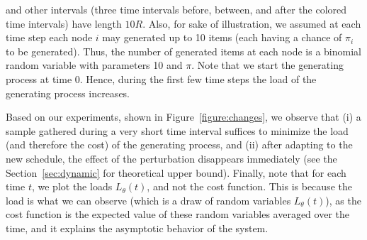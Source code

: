 

and other intervals (three time intervals before, between, and after the colored time intervals) have length $10R$. Also, for sake of illustration, we assumed at each time step each node $i$ may generated up to 10 items (each having a chance of $\pi_i$ to be generated). Thus, the number of generated items at each node is a binomial random variable with parameters 10 and $\pi$.
Note that we start the generating process at time 0. Hence, during the first few time steps the load of the generating process increases.

Based on our experiments, shown in Figure~\ref{figure:changes}, we observe that (i) a sample gathered during a very short time interval suffices to minimize the load (and therefore the cost) of the generating process, and (ii) after adapting to the new schedule, the effect of the perturbation disappears immediately (see the Section~\ref{sec:dynamic} for theoretical upper bound). Finally, note that for each time $t$, we plot the loads $L_\theta(t)$, and not the cost function. This is because the load is what we can observe (which is a draw of random variables $L_\theta(t)$), as the cost function is the expected value of these random variables averaged over the time, and it explains  the asymptotic behavior of the system.



